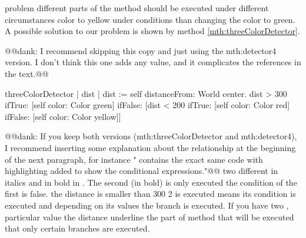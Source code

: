 { problem different parts of the method should be executed under different circumstances color  to yellow  under  conditions  than  changing the color to green. A possible solution to our problem is shown by method \ref{mth:threeColorDetector}. 

@@dank: I recommend skipping this copy and just using the mth:detector4 version.  I don't think this one adds any value, and it complicates the references in the text.@@
\begin{method}\label{mth:threeColorDetector}
threeColorDetector
   | dist | 
   dist := self distanceFrom: World  center.
   dist > 300
      ifTrue: [self color: Color green]
      ifFalse: [dist < 200
         ifTrue: [self color: Color red]
         ifFalse: [self color: Color yellow]]
\end{method}

@@dank: If you keep both versions (mth:threeColorDetector and mth:detector4), I recommend inserting some explanation about the relationship at the beginning of the next paragraph, for instance " contains the exact same code with highlighting added to show the conditional expressions."@@ 
 two different  in italics\add{,} and  in bold  in . The second  (in bold) is only executed  the condition of the first  is false.  the distance is smaller than 300 2 is executed means  its condition is executed and depending on its values\add{,} the  branch is executed. If you have  two ,  particular value  the distance underline the part of  method that will be executed that only certain branches are executed. 


}
